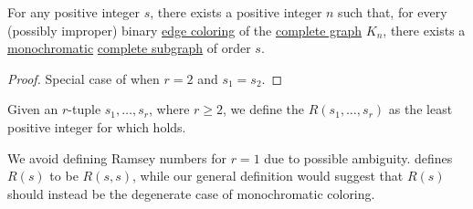 \begin{corollary}\label{thm:ramseys_theorem_single}
  For any positive integer \( s \), there exists a positive integer \( n \) such that, for every (possibly improper) binary \hyperref[def:graph_coloring]{edge coloring} of the \hyperref[def:complete_graph]{complete graph} \( K_n \), there exists a \hyperref[def:set_coloring/monochromatic]{monochromatic} \hyperref[def:complete_subgraph]{complete subgraph} of order \( s \).
\end{corollary}
\begin{proof}
  Special case of  when \( r = 2 \) and \( s_1 = s_2 \).
\end{proof}

\begin{definition}\label{def:ramsey_number}
  Given an \( r \)-tuple \( s_1, \ldots, s_r \), where \( r \geq 2 \), we define the  \( R(s_1, \ldots, s_r) \) as the least positive integer for which  holds.
\end{definition}
\begin{comments}
  \item We avoid defining Ramsey numbers for \( r = 1 \) due to possible ambiguity. \Textcite[183]{Bollobás1998ModernGraphTheory} defines \( R(s) \) to be \( R(s, s) \), while our general definition would suggest that \( R(s) \) should instead be the degenerate case of monochromatic coloring.
\end{comments}

